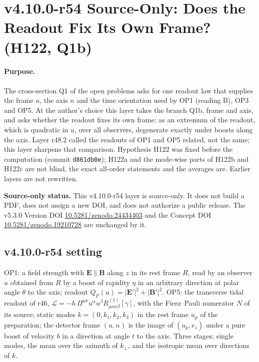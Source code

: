 
\clearpage
\section*{v4.10.0-r54 Source-Only: Does the Readout Fix Its Own Frame? (H122, Q1b)}
\label{sec:v4100-r54-readout-frame}

\paragraph{Purpose.}
The cross-section Q1 of the open problems asks for one readout law that supplies the frame \(u\), the axis \(n\) and the time orientation used by
OP1 (reading B), OP3 and OP5.  At the author's choice this layer takes the branch Q1b, frame and axis, and asks whether the readout fixes its own
frame: as an extremum of the readout, which is quadratic in \(u\), over all observers, degenerate exactly under boosts along the axis.  Layer r48.2
called the readouts of OP1 and OP5 related, not the same; this layer sharpens that comparison.  Hypothesis H122 was fixed before the computation
(commit \texttt{d861db0e}); H122a and the mode-wise parts of H122b and H122c are not blind, the exact all-order statements and the averages are.
Earlier layers are not rewritten.

\noindent\textbf{Source-only status.}
This v4.10.0-r54 layer is source-only.  It does not build a PDF, does not assign a new DOI,
and does not authorize a public release.  The v5.3.0 Version DOI
\href{https://doi.org/10.5281/zenodo.24434403}{10.5281/zenodo.24434403} and the Concept DOI
\href{https://doi.org/10.5281/zenodo.19210728}{10.5281/zenodo.19210728} are unchanged by it.

\subsection*{v4.10.0-r54 setting}
\label{subsec:v4100-r54-setting}

OP1: a field strength with \(\mathbf E\parallel\mathbf B\) along \(z\) in its rest frame \(R\), read by an observer \(u\) obtained from \(R\) by a boost of rapidity \(\eta\) in an arbitrary
direction at polar angle \(\theta\) to the axis; readout \(Q_F(u)=|\mathbf E'|^2+|\mathbf B'|^2\).  OP5: the transverse tidal readout of r46,
\(\mathcal L=-h\,\Pi^{\mu\nu}u^\alpha u^\beta R^{(1)}_{\mu\alpha\nu\beta}[\gamma]\), with the Fierz--Pauli numerator \(N\) of its source; static modes \(k=(0,k_1,k_2,k_3)\) in the rest
frame \(u_p\) of the preparation; the detector frame \((u,n)\) is the image of \((u_p,e_z)\) under a pure boost of velocity \(b\) in a direction at angle \(t\) to the axis.
Three stages: single modes, the mean over the azimuth of \(k_\perp\), and the isotropic mean over directions of \(k\).

